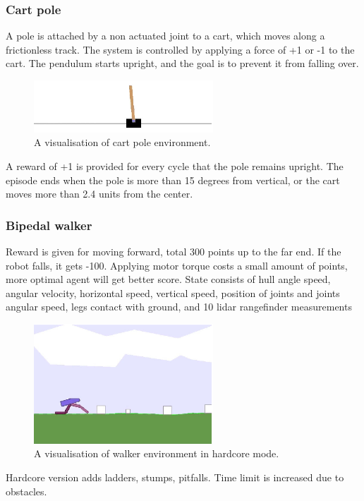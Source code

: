 \subsubsection{Cart pole}
A pole is attached by a non actuated joint to a cart, which moves along a frictionless track.
The system is controlled by applying a force of +1 or -1 to the cart.
The pendulum starts upright, and the goal is to prevent it from falling over. 
\begin{figure}[htb] 
	\centering
	\includegraphics[width=0.6\textwidth]{figures/cartpole}
	\caption{A visualisation of cart pole environment.}
	\label{fig:cartpole}
\end{figure}
A reward of +1 is provided for every cycle that the pole remains upright.
The episode ends when the pole is more than 15 degrees from vertical, or the cart moves more 
than 2.4 units from the center.

\FloatBarrier
\subsubsection{Bipedal walker}
Reward is given for moving forward, total 300 points up to the far end. 
If the robot falls, it gets -100. Applying motor torque costs a small amount of points, 
more optimal agent will get better score.
State consists of hull angle speed, angular velocity, horizontal speed, vertical speed,
position of joints and joints angular speed, legs contact with ground, and 10 lidar 
rangefinder measurements
\begin{figure}[htb] 
	\centering
	\includegraphics[width=0.6\textwidth]{figures/walker}
	\caption{A visualisation of walker environment in hardcore mode.}
	\label{fig:walker}
\end{figure}
Hardcore version adds ladders, stumps, pitfalls. Time limit is increased due to obstacles. 

